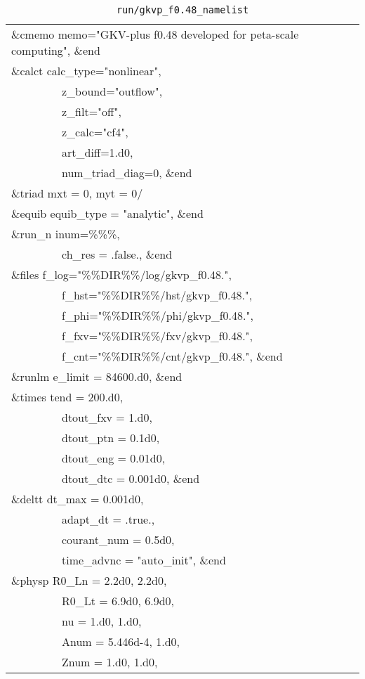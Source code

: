 \begin{table}[tb!]
  \caption{\texttt{run/gkvp\_f0.48\_namelist}}
  \centering
  \begin{tabular}{| l |}
  \hline
  \&cmemo memo="GKV-plus f0.48 developed for peta-scale computing", \&end\\
  \&calct calc\_type="nonlinear",\\
  ~~~~~~~~~z\_bound="outflow",\\
  ~~~~~~~~~z\_filt="off",\\
  ~~~~~~~~~z\_calc="cf4",\\
  ~~~~~~~~~art\_diff=1.d0,\\
  ~~~~~~~~~num\_triad\_diag=0, \&end\\
  \&triad mxt = 0, myt = 0/\\
  \&equib equib\_type = "analytic", \&end\\
  \&run\_n inum=\%\%\%,\\
  ~~~~~~~~~ch\_res = .false., \&end\\
  \&files f\_log="\%\%DIR\%\%/log/gkvp\_f0.48.",\\
  ~~~~~~~~~f\_hst="\%\%DIR\%\%/hst/gkvp\_f0.48.",\\
  ~~~~~~~~~f\_phi="\%\%DIR\%\%/phi/gkvp\_f0.48.",\\
  ~~~~~~~~~f\_fxv="\%\%DIR\%\%/fxv/gkvp\_f0.48.",\\
  ~~~~~~~~~f\_cnt="\%\%DIR\%\%/cnt/gkvp\_f0.48.", \&end\\
  \&runlm e\_limit = 84600.d0, \&end\\
  \&times tend = 200.d0,\\
  ~~~~~~~~~dtout\_fxv = 1.d0,\\
  ~~~~~~~~~dtout\_ptn = 0.1d0,\\
  ~~~~~~~~~dtout\_eng = 0.01d0,\\
  ~~~~~~~~~dtout\_dtc = 0.001d0, \&end\\
  \&deltt dt\_max = 0.001d0,\\
  ~~~~~~~~~adapt\_dt = .true., \\
  ~~~~~~~~~courant\_num = 0.5d0,\\
  ~~~~~~~~~time\_advnc = "auto\_init", \&end\\
  \&physp R0\_Ln = 2.2d0, 2.2d0,\\
  ~~~~~~~~~R0\_Lt = 6.9d0, 6.9d0,\\
  ~~~~~~~~~nu = 1.d0, 1.d0,\\
  ~~~~~~~~~Anum = 5.446d-4, 1.d0,\\
  ~~~~~~~~~Znum = 1.d0, 1.d0,\\

\end{tabular}
\end{table}
